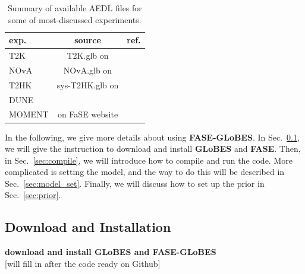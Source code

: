 \documentclass[aps,prd,nofootinbib,preprint]{revtex4}
\begin{document}
\begin{table}[h!]
\caption{\label{tab:exp}Summary of available AEDL files for some of most-discussed experiments.}
\centering
\begin{tabular}{l|c|r}
exp.   & source & ref. \\\hline\hline
T2K    &     T2K.glb on \cite{GLoBES}  &    \cite{Huber:2002mx}  \\
NOvA   &     NOvA.glb on \cite{GLoBES}   &   \cite{Ambats:2004js}   \\
T2HK   & sys-T2HK.glb on \cite{GLoBES}  &   \cite{Huber:2007xx}   \\
DUNE   &    \cite{Alion:2016uaj}    &  \cite{Alion:2016uaj}    \\
MOMENT &   on FaSE website    &     \cite{Cao:2014bea}
\end{tabular}
\end{table}

In the following, we give more details about using \textbf{FASE-GLoBES}. In Sec.~\ref{sec:download}, we will give the instruction to download and install \textbf{GLoBES} and \textbf{FASE}. Then, in Sec.~\ref{sec:compile}, we will introduce how to compile and run the code. More complicated is setting the model, and the way to do this will be described in Sec.~\ref{sec:model_set}. Finally, we will discuss how to set up the prior in Sec.~\ref{sec:prior}.


\subsection{Download and Installation}\label{sec:download}
\textbf{download and install GLoBES and FASE-GLoBES}\\
{\color{red}[will fill in after the code ready on Github]}
\end{document}
